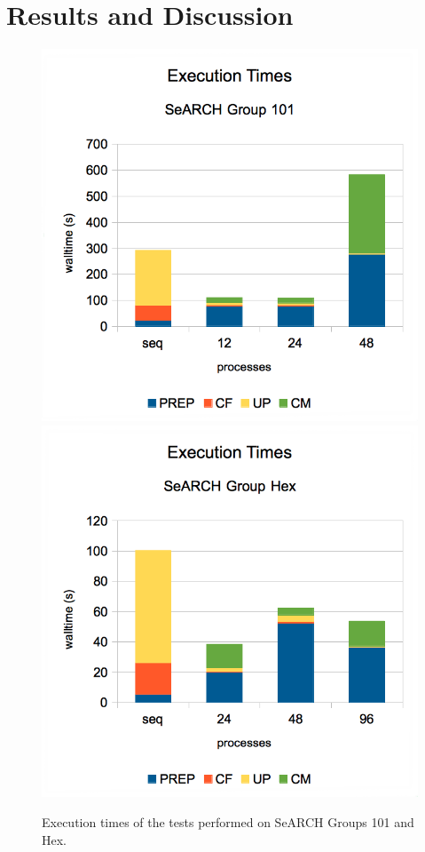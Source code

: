\section{Results and Discussion}
\label{sec:results}

\begin{figure}
	\begin{center}
		\includegraphics[width=\columnwidth]{report.may/images/exectime101.png}
		\includegraphics[width=\columnwidth]{report.may/images/exectimehex.png}
		\caption[Execution times]{Execution times of the tests performed on SeARCH Groups 101 and Hex.}
	\end{center}
	\label{fig:exectime}
\end{figure}

